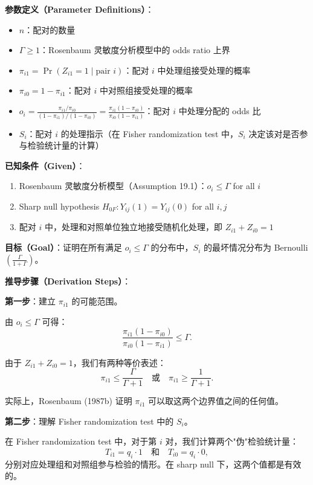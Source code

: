\textbf{参数定义（Parameter Definitions）}：
\begin{itemize}
  \item $n$：配对的数量
  \item $\Gamma \geq 1$：Rosenbaum 灵敏度分析模型中的 odds ratio 上界
  \item $\pi_{i1} = \Pr(Z_{i1}=1 \mid \text{pair } i)$：配对 $i$ 中处理组接受处理的概率
  \item $\pi_{i0} = 1 - \pi_{i1}$：配对 $i$ 中对照组接受处理的概率
  \item $o_i = \frac{\pi_{i1}/\pi_{i0}}{(1-\pi_{i1})/(1-\pi_{i0})} = \frac{\pi_{i1}(1-\pi_{i0})}{\pi_{i0}(1-\pi_{i1})}$：配对 $i$ 中处理分配的 odds 比
  \item $S_i$：配对 $i$ 的处理指示（在 Fisher randomization test 中，$S_i$ 决定该对是否参与检验统计量的计算）
\end{itemize}

\textbf{已知条件（Given）}：
\begin{enumerate}
  \item Rosenbaum 灵敏度分析模型（Assumption 19.1）：$o_i \leq \Gamma$ for all $i$
  \item Sharp null hypothesis $H_{0F}: Y_{ij}(1) = Y_{ij}(0)$ for all $i,j$
  \item 配对 $i$ 中，处理和对照单位独立地接受随机化处理，即 $Z_{i1} + Z_{i0} = 1$
\end{enumerate}

\textbf{目标（Goal）}：证明在所有满足 $o_i \leq \Gamma$ 的分布中，$S_i$ 的最坏情况分布为 Bernoulli$\left(\frac{\Gamma}{1+\Gamma}\right)$。

\textbf{推导步骤（Derivation Steps）}：

\textbf{第一步}：建立 $\pi_{i1}$ 的可能范围。

由 $o_i \leq \Gamma$ 可得：
\[
\frac{\pi_{i1}(1-\pi_{i0})}{\pi_{i0}(1-\pi_{i1})} \leq \Gamma.
\]

由于 $Z_{i1} + Z_{i0} = 1$，我们有两种等价表述：
\[
\pi_{i1} \leq \frac{\Gamma}{\Gamma + 1} \quad \text{或} \quad \pi_{i1} \geq \frac{1}{\Gamma + 1}.
\]

实际上，Rosenbaum (1987b) 证明 $\pi_{i1}$ 可以取这两个边界值之间的任何值。

\textbf{第二步}：理解 Fisher randomization test 中的 $S_i$。

在 Fisher randomization test 中，对于第 $i$ 对，我们计算两个"伪"检验统计量：
\[
T_{i1} = q_i \cdot 1 \quad \text{和} \quad T_{i0} = q_i \cdot 0,
\]
分别对应处理组和对照组参与检验的情形。在 sharp null 下，这两个值都是有效的。

